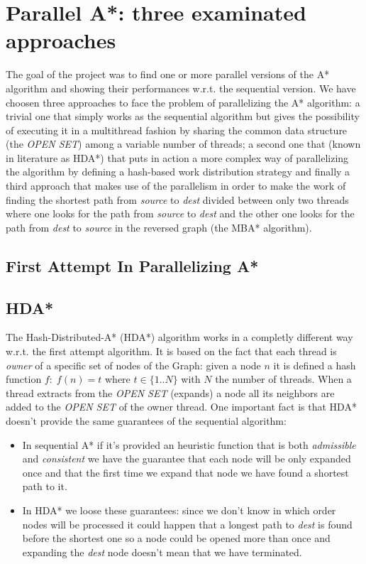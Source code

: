 \documentclass[twocolumn, switch]{article} %
\begin{document}
\section{Parallel A*: three examinated approaches}
The goal of the project was to find one or more parallel versions of the A* algorithm 
and showing their performances w.r.t. the sequential version. We have choosen three approaches
to face the problem of parallelizing the A* algorithm: a trivial one that simply
works as the sequential algorithm but gives the possibility of executing it in a multithread
fashion by sharing the common data structure (the \textit{OPEN SET}) among a variable number
of threads; a second one that (known in literature as HDA*) that puts in action a more
complex way of parallelizing the algorithm by defining a hash-based work distribution strategy and
finally a third approach that makes use of the parallelism in order to make the work of
finding the shortest path from \textit{source} to \textit{dest} divided between only two threads
where one looks for the path from \textit{source} to \textit{dest} and the other one looks
for the path from \textit{dest} to \textit{source} in the reversed graph (the MBA* algorithm).

\subsection{First Attempt In Parallelizing A*}

\subsection{HDA*}
The Hash-Distributed-A* (HDA*) algorithm works in a completly different way w.r.t. the 
first attempt algorithm. It is based on the fact that each thread is \textit{owner} of a
specific set of nodes of the Graph: given a node $n$ it is defined a hash function $f:\;f(n) = t$
where $t \in \{1..N\}$ with $N$ the number of threads. When a thread extracts from the \textit{OPEN SET}
(expands) a node all its neighbors are added to the \textit{OPEN SET} of the owner thread. One important
fact is that HDA* doesn't provide the same guarantees of the sequential algorithm:
\begin{itemize}
  \item In sequential A* if it's provided an heuristic function that is both \textit{admissible}
        and \textit{consistent} we have the guarantee that each node will be only expanded once
        and that the first time we expand that node we have found a shortest path to it.
  \item In HDA* we loose these guarantees: since we don't know in which order nodes will be processed
        it could happen that a longest path to \textit{dest} is found before the shortest one so
        a node could be opened more than once and expanding the \textit{dest} node doesn't
        mean that we have terminated.
\end{itemize}
\end{document}
